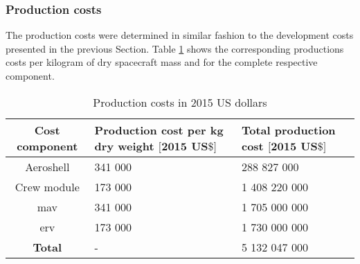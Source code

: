 \subsubsection{Production costs}
The production costs were determined in similar fashion to the development costs presented in the previous Section. Table \ref{tab:productioncosts} shows the corresponding productions costs per kilogram of dry spacecraft mass and for the complete respective component.
\begin{table}
	\centering
	\caption{Production costs in 2015 US dollars}
	\begin{tabular}{|c|p{5cm}|p{5cm}|}
		\hline
		\textbf{Cost component} & \textbf{Production cost per kg dry weight $\mathbf{[2015}$ $\mathbf{US\$]}$} & \textbf{Total production cost $\mathbf{[2015}$ $\mathbf{US\$]}$} \\
		\hline \hline
		Aeroshell & 341 000 & 288 827 000 \\
		Crew module & 173 000 & 1 408 220 000 \\ 
		\acrlong{mav} & 341 000 & 1 705 000 000 \\
		\acrlong{erv} & 173 000 & 1 730 000 000 \\ \hline
		\textbf{Total} & - & 5 132 047 000 \\
		\hline
	\end{tabular}
	\label{tab:productioncosts}
\end{table}

